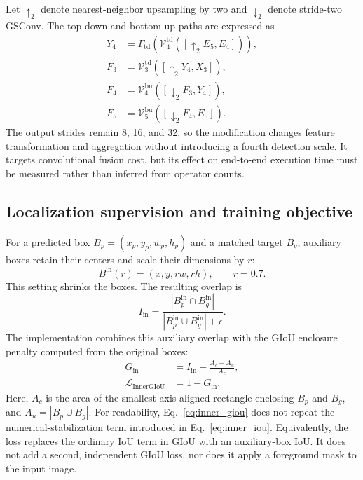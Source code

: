 \documentclass[pdflatex,sn-mathphys-num,iicol]{sn-jnl}
\begin{document}
Let $\uparrow_2$ denote nearest-neighbor upsampling by two and $\downarrow_2$ denote stride-two GSConv. The top-down and bottom-up paths are expressed as
\begin{equation}
\begin{aligned}
 Y_4&=\Gamma_{\mathrm{td}}\!\left(\mathcal{V}_4^{\mathrm{td}}([\uparrow_2 E_5,E_4])\right),\\
 F_3&=\mathcal{V}_3^{\mathrm{td}}([\uparrow_2 Y_4,X_3]),\\
 F_4&=\mathcal{V}_4^{\mathrm{bu}}([\downarrow_2 F_3,Y_4]),\\
 F_5&=\mathcal{V}_5^{\mathrm{bu}}([\downarrow_2 F_4,E_5]).
\end{aligned}
\label{eq:neck}
\end{equation}
The output strides remain 8, 16, and 32, so the modification changes feature transformation and aggregation without introducing a fourth detection scale. It targets convolutional fusion cost, but its effect on end-to-end execution time must be measured rather than inferred from operator counts.

\subsection{Localization supervision and training objective}\label{sec:loss}

For a predicted box $B_p=(x_p,y_p,w_p,h_p)$ and a matched target $B_g$, auxiliary boxes retain their centers and scale their dimensions by $r$:
\begin{equation}
 B^{\mathrm{in}}(r)=(x,y,rw,rh),\qquad r=0.7.
\label{eq:inner_box}
\end{equation}
This setting shrinks the boxes. The resulting overlap is
\begin{equation}
 I_{\mathrm{in}}=
 \frac{|B_p^{\mathrm{in}}\cap B_g^{\mathrm{in}}|}
 {|B_p^{\mathrm{in}}\cup B_g^{\mathrm{in}}|+\epsilon}.
\label{eq:inner_iou}
\end{equation}
The implementation combines this auxiliary overlap with the GIoU enclosure penalty computed from the original boxes:
\begin{equation}
\begin{aligned}
 G_{\mathrm{in}}&= I_{\mathrm{in}}-\frac{A_c-A_u}{A_c},\\
 \mathcal{L}_{\mathrm{InnerGIoU}}&=1-G_{\mathrm{in}}.
\end{aligned}
\label{eq:inner_giou}
\end{equation}
Here, $A_c$ is the area of the smallest axis-aligned rectangle enclosing $B_p$ and $B_g$, and $A_u=|B_p\cup B_g|$. For readability, Eq.~\eqref{eq:inner_giou} does not repeat the numerical-stabilization term introduced in Eq.~\eqref{eq:inner_iou}. Equivalently, the loss replaces the ordinary IoU term in GIoU with an auxiliary-box IoU. It does not add a second, independent GIoU loss, nor does it apply a foreground mask to the input image.
\end{document}
